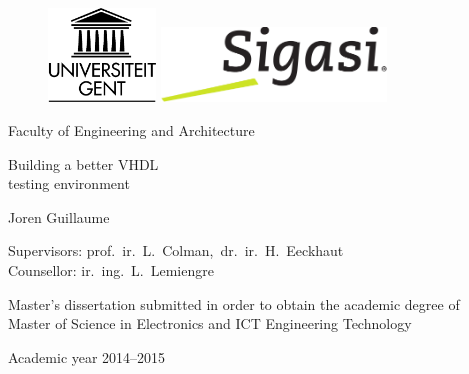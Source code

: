 \documentclass[11pt,british]{article}
\begin{document}
\begin{titlepage}

\setlength{\voffset}{-1in}
\setlength{\topmargin}{1.5cm}
\setlength{\headheight}{0.5cm}
\setlength{\headsep}{1cm}
\setlength{\footskip}{1.5cm}
\enlargethispage{1cm}

\fontsize{12pt}{14pt}
\selectfont

\begin{center}


\begin{figure}
\centerline{%
\includegraphics[height=2.5cm]{images/ruglogo}
\hspace{0.5cm}
\includegraphics[height=2cm]{images/sigasi}
}%
\end{figure}


\vspace{0.5cm}

\fontsize{14pt}{16pt}
\selectfont

Faculty of Engineering and Architecture\\

\vspace{4.5cm}

\fontsize{17.28pt}{21pt}
\selectfont

Building a better VHDL\\
testing environment

\fontsize{14pt}{16pt}
\selectfont

\vspace{1.2cm}

Joren Guillaume

\fontsize{12pt}{14pt}
\selectfont

\vspace{3.5cm}

Supervisors: prof.~ir.~L.~Colman,~dr.~ir.~H.~Eeckhaut\\
Counsellor: ir.~ing.~L.~Lemiengre\\

\vspace{2cm}

Master's dissertation submitted in order to obtain the academic degree of\\
Master of Science in Electronics and ICT Engineering Technology

\vspace{1cm}

Academic year 2014--2015

\end{center}
\end{titlepage}
\end{document}
